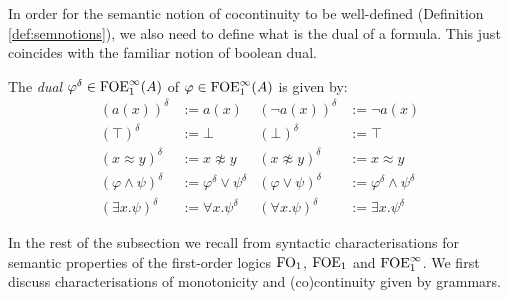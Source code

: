 In order for the semantic notion of cocontinuity to be well-defined (Definition \ref{def:semnotions}), we also need to define what is the dual of a formula. This just coincides with the familiar notion of boolean dual.
\begin{definition}\label{def:concreteduals} 
The \emph{dual} $\varphi^{\delta} \in {\ensuremath{\mathrm{FOE}^{\infty}_1}}(A)$ of $\varphi\in {\ensuremath{\mathrm{FOE}^{\infty}_1}}(A)$ is given by:
\begin{align*}
 (a(x))^{\delta} & :=  a(x) 
 & (\lnot a(x))^{\delta} & :=  \lnot a(x) 
\\ (\top)^{\delta} & :=  \bot 
  & (\bot)^{\delta} & :=  \top 
\\  (x \approx y)^{\delta} & :=  x \not\approx y 
  & (x \not\approx y)^{\delta}& :=  x \approx y 
\\ (\varphi \wedge \psi)^{\delta} &:=  \varphi^{\delta} \vee \psi^{\delta} 
  &(\varphi \vee \psi)^{\delta}& :=  \varphi^{\delta} \wedge \psi^{\delta}
\\ (\exists x.\psi)^{\delta} &:=  \forall x.\psi^{\delta} 
  &(\forall x.\psi)^{\delta} &:=  \exists x.\psi^{\delta} 
\end{align*}
\end{definition}


In the rest of the subsection we recall from \cite{CFVZ-ModelTheoryPaper} syntactic characterisations for semantic properties of the first-order logics $\mathrm{FO}_1$, $\mathrm{FOE}_1$ and $\mathrm{FOE}^{\infty}_1$. We first discuss characterisations of monotonicity and (co)continuity given by grammars. 

